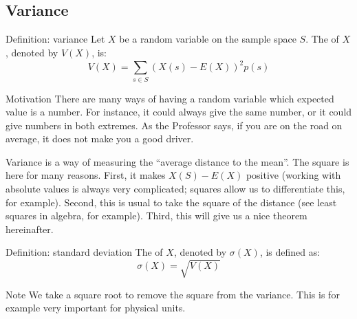 \documentclass[a4paper]{article}
\begin{document}
\subsection{Variance}
\begin{parag}{Definition: variance}
    Let $X$ be a random variable on the sample space $S$. The  of $X$, denoted by $V\left(X\right)$, is: 
    \[V\left(X\right) = \sum_{s \in S}^{} \left(X\left(s\right) - E\left(X\right)\right)^2 p\left(s\right)\]
    
    \begin{subparag}{Motivation}
        There are many ways of having a random variable which expected value is a number. For instance, it could always give the same number, or it could give numbers in both extremes. As the Professor says, if you are on the road on average, it does not make you a good driver.

        Variance is a way of measuring the ``average distance to the mean''. The square is here for many reasons. First, it makes $X\left(S\right) - E\left(X\right)$ positive (working with absolute values is always very complicated; squares allow us to differentiate this, for example). Second, this is usual to take the square of the distance (see least squares in algebra, for example). Third, this will give us a nice theorem hereinafter.
    \end{subparag}
\end{parag}

\begin{parag}{Definition: standard deviation}
    The  of $X$, denoted by $\sigma\left(X\right)$, is defined as: 
    \[\sigma\left(X\right) = \sqrt{V\left(X\right)}\]
    
    \begin{subparag}{Note}
        We take a square root to remove the square from the variance. This is for example very important for physical units.
    \end{subparag}
    
\end{parag}
\end{document}
